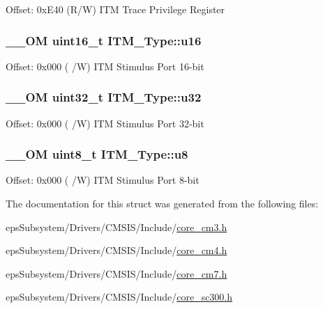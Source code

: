 Offset\-: 0x\-E40 (R/\-W) I\-T\-M Trace Privilege Register \hypertarget{struct_i_t_m___type_a962a970dfd286cad7f8a8577e87d4ad3}{
\subsubsection[{u16}]{\setlength{\rightskip}{0pt plus 5cm}\-\_\-\-\_\-\-O\-M uint16\-\_\-t I\-T\-M\-\_\-\-Type\-::u16}}\label{struct_i_t_m___type_a962a970dfd286cad7f8a8577e87d4ad3}
Offset\-: 0x000 ( /\-W) I\-T\-M Stimulus Port 16-\/bit \hypertarget{struct_i_t_m___type_a5834885903a557674f078f3b71fa8bc8}{
\subsubsection[{u32}]{\setlength{\rightskip}{0pt plus 5cm}\-\_\-\-\_\-\-O\-M uint32\-\_\-t I\-T\-M\-\_\-\-Type\-::u32}}\label{struct_i_t_m___type_a5834885903a557674f078f3b71fa8bc8}
Offset\-: 0x000 ( /\-W) I\-T\-M Stimulus Port 32-\/bit \hypertarget{struct_i_t_m___type_ae773bf9f9dac64e6c28b14aa39f74275}{
\subsubsection[{u8}]{\setlength{\rightskip}{0pt plus 5cm}\-\_\-\-\_\-\-O\-M uint8\-\_\-t I\-T\-M\-\_\-\-Type\-::u8}}\label{struct_i_t_m___type_ae773bf9f9dac64e6c28b14aa39f74275}
Offset\-: 0x000 ( /\-W) I\-T\-M Stimulus Port 8-\/bit 

The documentation for this struct was generated from the following files\-:\begin{DoxyCompactItemize}
\item 
eps\-Subsystem/\-Drivers/\-C\-M\-S\-I\-S/\-Include/\hyperlink{core__cm3_8h}{core\-\_\-cm3.\-h}\item 
eps\-Subsystem/\-Drivers/\-C\-M\-S\-I\-S/\-Include/\hyperlink{core__cm4_8h}{core\-\_\-cm4.\-h}\item 
eps\-Subsystem/\-Drivers/\-C\-M\-S\-I\-S/\-Include/\hyperlink{core__cm7_8h}{core\-\_\-cm7.\-h}\item 
eps\-Subsystem/\-Drivers/\-C\-M\-S\-I\-S/\-Include/\hyperlink{core__sc300_8h}{core\-\_\-sc300.\-h}\end{DoxyCompactItemize}
